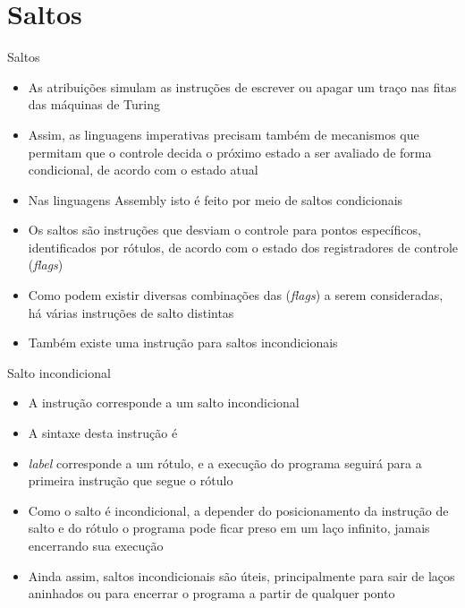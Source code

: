 \section{Saltos}

\begin{frame}[fragile]{Saltos}

    \begin{itemize}
        \item As atribuições simulam as instruções de escrever ou apagar um traço nas fitas das
            máquinas de Turing

        \item Assim, as linguagens imperativas precisam também de mecanismos que permitam que o
            controle decida o próximo estado a ser avaliado de forma condicional, de acordo com o
            estado atual

        \item Nas linguagens Assembly isto é feito por meio de saltos condicionais

        \item Os saltos são instruções que desviam o controle para pontos específicos, 
            identificados por rótulos, de acordo com o estado dos registradores de controle
            ({\it flags})

        \item Como podem existir diversas combinações das (\textit{flags}) a serem
            consideradas, há várias instruções de salto distintas

        \item Também existe uma instrução para saltos incondicionais
    \end{itemize}

\end{frame}

\begin{frame}[fragile]{Salto incondicional}

    \begin{itemize}
        \item A instrução  corresponde a um salto incondicional

        \item A sintaxe desta instrução é


        \item \textit{label} corresponde a um rótulo, e a execução do programa seguirá para a
            primeira instrução que segue o rótulo

        \item Como o salto é incondicional, a depender do posicionamento da instrução de salto e
            do rótulo o programa pode ficar preso em um laço infinito, jamais encerrando sua
            execução

        \item Ainda assim, saltos incondicionais são úteis, principalmente para sair de laços 
            aninhados ou para encerrar o programa a partir de qualquer ponto
    \end{itemize}

\end{frame}

